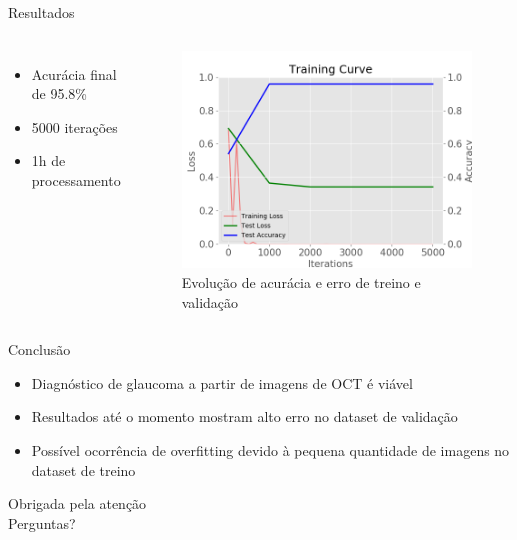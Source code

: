 \documentclass{beamer}
\begin{document}
\begin{frame}{Resultados}
    \begin{columns}
            \begin{itemize}
                \item Acurácia final de 95.8\%
                \item 5000 iterações
                \item 1h de processamento
            \end{itemize}
		
            \begin{figure}
                \includegraphics[width=\linewidth]{img/curve_vgg16.png}
                \caption{Evolução de acurácia e erro de treino e validação} 
            \end{figure}            
            
    \end{columns}
    
\end{frame}

\begin{frame}{Conclusão}
    \begin{itemize}
        \item Diagnóstico de glaucoma a partir de imagens de OCT é viável
        \item Resultados até o momento mostram alto erro no dataset de validação
        \item Possível ocorrência de overfitting devido à pequena quantidade de imagens no dataset de treino
    \end{itemize}
\end{frame}

\begin{frame}[focus]
	Obrigada pela atenção \\ Perguntas?
\end{frame}


\end{document}
